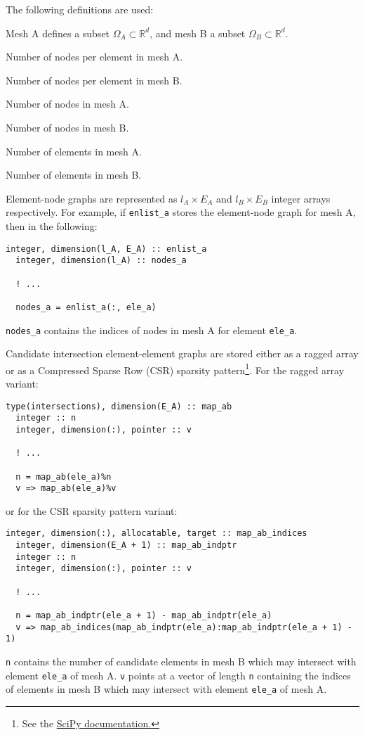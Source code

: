 \documentclass{article}
\begin{document}
The following definitions are used:
\begin{description}[leftmargin=\parindent,labelindent=\parindent]
  \item[$d$] Mesh A defines a subset $\Omega_A \subset \mathbb{R}^d$, and mesh B
    a subset $\Omega_B \subset \mathbb{R}^d$.
  \item[$l_A$] Number of nodes per element in mesh A.
  \item[$l_B$] Number of nodes per element in mesh B.
  \item[$V_A$] Number of nodes in mesh A.
  \item[$V_B$] Number of nodes in mesh B.
  \item[$E_A$] Number of elements in mesh A.
  \item[$E_B$] Number of elements in mesh B.
\end{description}

Element-node graphs are represented as $l_A \times E_A$ and
$l_B \times E_B$ integer arrays respectively. For example, if \verb+enlist_a+
stores the element-node graph for mesh A, then in the following:
\begin{lstlisting}[language=FORTRAN]
  integer, dimension(l_A, E_A) :: enlist_a
  integer, dimension(l_A) :: nodes_a
  
  ! ...

  nodes_a = enlist_a(:, ele_a)
\end{lstlisting}
\verb+nodes_a+ contains the indices of nodes in mesh A for element \verb+ele_a+.

Candidate intersection element-element graphs are stored either as a ragged
array or as a Compressed Sparse Row (CSR) sparsity pattern\footnote{See the
\href{http://docs.scipy.org/doc/scipy-0.15.1/reference/generated/scipy.sparse.csr_matrix.html}{SciPy documentation.}}.
For the ragged array variant:
\begin{lstlisting}[language=FORTRAN]
  type(intersections), dimension(E_A) :: map_ab
  integer :: n
  integer, dimension(:), pointer :: v
  
  ! ...

  n = map_ab(ele_a)%n
  v => map_ab(ele_a)%v
\end{lstlisting}
or for the CSR sparsity pattern variant:
\begin{lstlisting}[language=FORTRAN]
  integer, dimension(:), allocatable, target :: map_ab_indices
  integer, dimension(E_A + 1) :: map_ab_indptr
  integer :: n
  integer, dimension(:), pointer :: v
  
  ! ...

  n = map_ab_indptr(ele_a + 1) - map_ab_indptr(ele_a)
  v => map_ab_indices(map_ab_indptr(ele_a):map_ab_indptr(ele_a + 1) - 1)
\end{lstlisting}
\verb+n+ contains the number of candidate elements in mesh B which may intersect
with element \verb+ele_a+ of mesh A. \verb+v+ points at a vector of length
\verb+n+ containing the indices of elements in mesh B which may intersect with
element \verb+ele_a+ of mesh A.
\end{document}

